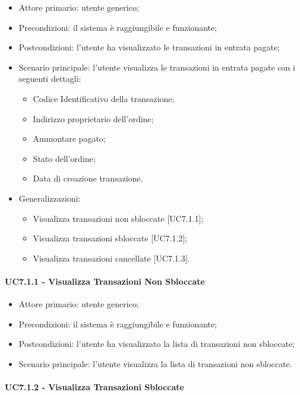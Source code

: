 \begin{itemize}
    \item Attore primario: utente generico;
    \item Precondizioni: il sistema è raggiungibile e funzionante;
    \item Postcondizioni: l'utente ha visualizzato le transazioni in entrata pagate;
    \item Scenario principale: l'utente visualizza le transazioni in entrata pagate con i seguenti dettagli:
        \begin{itemize}
            \item Codice Identificativo della transazione;
            \item Indirizzo proprietario dell'ordine;
            \item Ammontare pagato;
            \item Stato dell'ordine;
            \item Data di creazione transazione.
        \end{itemize}
    \item Generalizzazioni:
        \begin{itemize}
            \item Visualizza transazioni non sbloccate [UC7.1.1];
            \item Visualizza transazioni sbloccate [UC7.1.2];
            \item Visualizza transazioni cancellate [UC7.1.3].
        \end{itemize}
\end{itemize}

\paragraph{UC7.1.1 - Visualizza Transazioni Non Sbloccate}

\begin{itemize}
    \item Attore primario: utente generico;
    \item Precondizioni: il sistema è raggiungibile e funzionante;
    \item Postcondizioni: l'utente ha visualizzato la lista di transazioni non sbloccate;
    \item Scenario principale: l'utente visualizza la lista di transazioni non sbloccate.
\end{itemize}

\paragraph{UC7.1.2 - Visualizza Transazioni Sbloccate}


